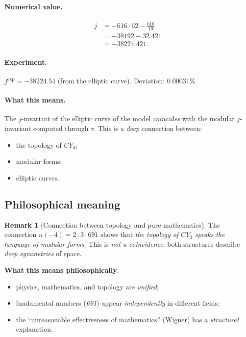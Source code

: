 \documentclass[11pt,a4paper]{article}
\newcommand{\CY}{CY_3}
\theoremstyle{definition}
\newtheorem{remark}[theorem]{Remark}
\begin{document}
\paragraph{Numerical value.}
\begin{align}
    j &= -616 \cdot 62 - \frac{616}{19} \\
      &= -38192 - 32.421 \\
      &= -38224.421.
\end{align}

\paragraph{Experiment.}
$j^{\text{exp}} = -38224.54$ (from the elliptic curve).
Deviation: $0.00031\%$.

\paragraph{What this means.}
The $j$-invariant of the elliptic curve of the model \emph{coincides} 
with the modular $j$-invariant computed through $\tau$. 
This is a \emph{deep} connection between:
\begin{itemize}
    \item the topology of $\CY$;
    \item modular forms;
    \item elliptic curves.
\end{itemize}

\subsection{Philosophical meaning}
\label{subsec:modular-philosophy}

\begin{remark}[Connection between topology and pure mathematics]
\label{rem:topology-pure-math}
The connection $n(-4) = 2 \cdot 3 \cdot 691$ shows that 
\emph{the topology of $\CY$ speaks the language of modular forms}. 
This is \emph{not a coincidence}: both structures describe 
\emph{deep symmetries} of space.

\medskip\noindent
\textbf{What this means philosophically}: 
\begin{itemize}
    \item physics, mathematics, and topology are \emph{unified};
    \item fundamental numbers (\emph{691}) appear 
          \emph{independently} in different fields;
    \item the ``unreasonable effectiveness of mathematics'' 
          (Wigner) has a \emph{structural} explanation.
\end{itemize}
\end{remark}
\end{document}
